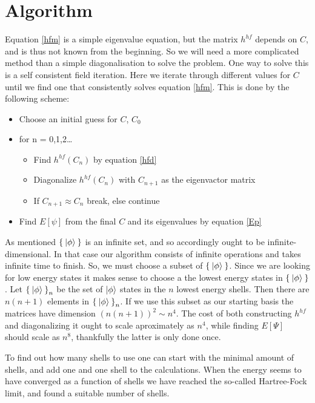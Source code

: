 \documentclass[a4paper,english,12pt]{article}
\begin{document}
  
\section{Algorithm}
Equation \ref{hfm} is a simple eigenvalue equation, but the matrix  $h^{hf}$ depends on $C$, and is thus not known from the beginning. So we will need a more complicated
method than a simple diagonalisation to solve the problem. One way to solve this is a self consistent field iteration. Here we iterate through
different values for $C$ until we find one that consistently solves equation \ref{hfm}. This is done by the following scheme:
\begin{itemize}
\item
  Choose an initial guess for $C$, $C_0$
\item for n = 0,1,2\ldots
  \begin{itemize}
  \item Find $h^{hf}(C_n)$ by equation \ref{hfd}
  \item Diagonalize $h^{hf}(C_n)$ with $C_{n+1}$ as the eigenvactor matrix
  \item If $C_{n+1}\approx C_n$ break, else continue
  \end{itemize}
\item
  Find $E[\psi]$ from the final $C$ and its eigenvalues by equation \ref{Ep}
\end{itemize}

As mentioned \(\Set{\Ket{\phi}}\) is an infinite set, and so accordingly ought to be infinite-dimensional.
In that case our algorithm consists of infinite operations and takes infinite time to finish.
So, we must choose a subset of \(\Set{\Ket{\phi}}\).
Since we are looking for low energy states it makes sense to choose a the lowest energy states in \(\Set{\Ket{\phi}}\).
Let \(\Set{\Ket{\phi}}_n\) be the set of $\ket{\phi}$ states in the $n$ lowest energy shells. Then there are $n(n+1)$ elements in
\(\Set{\Ket{\phi}}_n\). If we use this subset as our starting basis the matrices have dimension $(n(n+1))^2\sim n^4$. The cost of both constructing
$h^{hf}$ and diagonalizing it ought to scale aproximately as $n^4$, while finding $E[\Psi]$ should scale as $n^8$, thankfully the latter is only done
once.

To find out how many shells to use one can start with the minimal amount of shells, and add one and one shell to the calculations. When the energy seems
to have converged as a function of shells we have reached the so-called Hartree-Fock limit, and found a suitable number of shells.  
\end{document}
